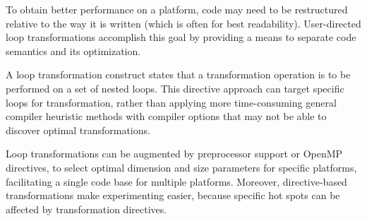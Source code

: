 \label{chap:loop_transformations}

To obtain better performance on a platform, code may need to be restructured 
relative to the way it is written (which is often for best readability).
User-directed loop transformations accomplish this goal by providing a means 
to separate code semantics and its optimization.

A loop transformation construct states that a transformation operation is to be 
performed on a set of nested loops.  This directive approach can target specific loops
for transformation, rather than applying more time-consuming general compiler 
heuristic methods with compiler options that may not be able to discover 
optimal transformations.

Loop transformations can be augmented by preprocessor support or OpenMP  
directives, to select optimal dimension and size parameters for specific platforms,
facilitating a single code base for multiple platforms.
Moreover, directive-based transformations make experimenting easier, 
because specific hot spots can be affected by transformation directives.










